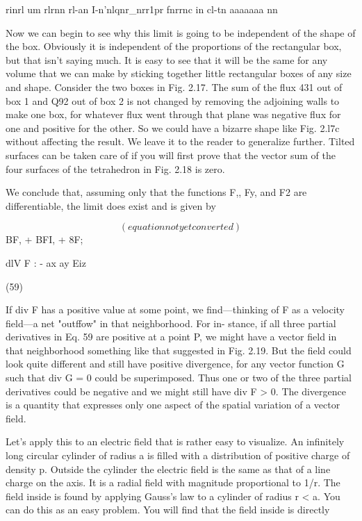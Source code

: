 rinrl um rlrnn rl-an I-n'nlqnr_nrr1pr fnrrnc in cl-tn aaaaaaa nn

Now we can begin to see why this limit is going to be independent
of the shape of the box. Obviously it is independent of the proportions
of the rectangular box, but that isn't saying much. It is easy to
see that it will be the same for any volume that we can make by sticking
together little rectangular boxes of any size and shape. Consider
the two boxes in Fig. 2.17. The sum of the flux 431 out of box 1 and
Q92 out of box 2 is not changed by removing the adjoining walls to
make one box, for whatever flux went through that plane was negative
flux for one and positive for the other. So we could have a
bizarre shape like Fig. 2.l7c without affecting the result. We leave it
to the reader to generalize further. Tilted surfaces can be taken care
of if you will first prove that the vector sum of the four surfaces of the
tetrahedron in Fig. 2.18 is zero.

We conclude that, assuming only that the functions F,, Fy, and F2
are differentiable, the limit does exist and is given by

\begin{equation}
(equation not yet converted)
\end{equation}
BF, + BFI, + 8F;

dlV F : -
ax ay Eiz

(59)

If div F has a positive value at some point, we find---thinking of F
as a velocity field---a net "outffow" in that neighborhood. For in-
stance, if all three partial derivatives in Eq. 59 are positive at a
point P, we might have a vector field in that neighborhood something
like that suggested in Fig. 2.19. But the field could look quite different
and still have positive divergence, for any vector function G
such that div G = 0 could be superimposed. Thus one or two of the
three partial derivatives could be negative and we might still have
div F > 0. The divergence is a quantity that expresses only one
aspect of the spatial variation of a vector field.

Let's apply this to an electric field that is rather easy to visualize.
An infinitely long circular cylinder of radius a is filled with a distribution
of positive charge of density p. Outside the cylinder the electric
field is the same as that of a line charge on the axis. It is a radial
field with magnitude proportional to 1/r. The field inside is found
by applying Gauss's law to a cylinder of radius r < a. You can do
this as an easy problem. You will find that the field inside is directly

